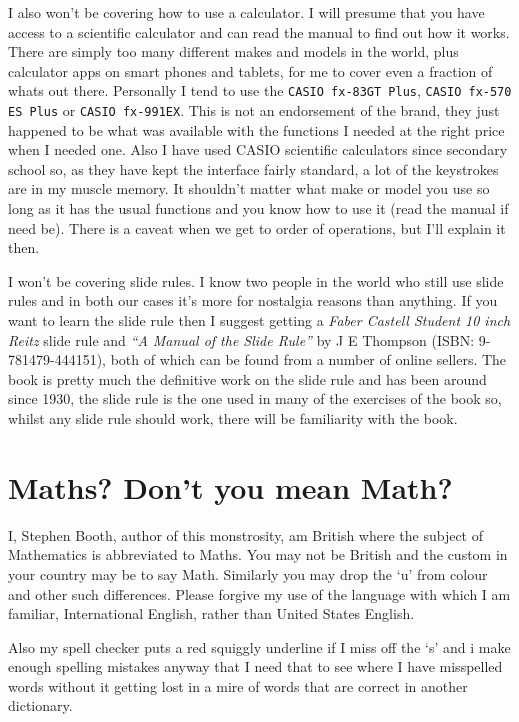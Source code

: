 I also won't be covering how to use a calculator.  I will presume that you have access to a scientific calculator and can read the manual to find out how it works.  There are simply too many different makes and models in the world, plus calculator apps on smart phones and tablets, for me to cover even a fraction of whats out there.  Personally I tend to use the \texttt{CASIO fx-83GT Plus}, \texttt{CASIO fx-570 ES Plus} or \texttt{CASIO fx-991EX}.  This is not an endorsement of the brand, they just happened to be what was available with the functions I needed at the right price when I needed one.  Also I have used CASIO scientific calculators since secondary school so, as they have kept the interface fairly standard, a lot of the keystrokes are in my muscle memory.  It shouldn't matter what make or model you use so long as it has the usual functions and you know how to use it (read the manual if need be).  There is a caveat when we get to order of operations, but I'll explain it then.

I won't be covering slide rules.  I know two people in the world who still use slide rules and in both our cases it's more for nostalgia reasons than anything.  If you want to learn the slide rule then I suggest getting a \textit{Faber Castell Student 10 inch Reitz} slide rule and \textit{``A Manual of the Slide Rule''} by J E Thompson (\textsc{ISBN: 9-781479-444151}), both of which can be found from a number of online sellers.  The book is pretty much the definitive work on the slide rule and has been around since 1930, the slide rule is the one used in many of the exercises of the book so, whilst any slide rule should work, there will be familiarity with the book.

\section*{Maths?  Don't you mean Math?}
I, Stephen Booth, author of this monstrosity, am British where the subject of Mathematics is abbreviated to Maths.  You may not be British and the custom in your country may be to say Math.  Similarly you may drop the `u' from colour and other such differences.  Please forgive my use of the language with which I am familiar, International English, rather than United States English.

Also my spell checker puts a red squiggly underline if I miss off the `s' and i make enough spelling mistakes anyway that I need that to see where I have misspelled words without it getting lost in a mire of words that are correct in another dictionary.

